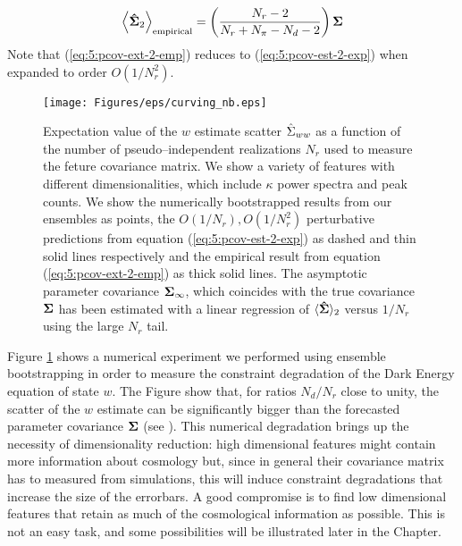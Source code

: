 \begin{equation}
\label{eq:5:pcov-ext-2-emp}
\left\langle\mathbf{\hat{\Sigma}}_2\right\rangle_{\rm empirical} = \left(\frac{N_r-2}{N_r+N_\pi-N_d-2}\right)\mathbf{\Sigma}
\end{equation}
%
Note that (\ref{eq:5:pcov-ext-2-emp}) reduces to (\ref{eq:5:pcov-est-2-exp}) when expanded to order $O(1/N_r^2)$. 
%
\begin{figure}
\begin{center}
\texttt{[image: Figures/eps/curving\_nb.eps]}
\end{center}
\caption{Expectation value of the $w$ estimate scatter $\hat{\Sigma}_{ww}$ as a function of the number of pseudo--independent realizations $N_r$ used to measure the feture covariance matrix. We show a variety of features with different dimensionalities, which include $\kappa$ power spectra and peak counts. We show the numerically bootstrapped results from our ensembles as points, the $O(1/N_r),O(1/N_r^2)$ perturbative predictions from equation (\ref{eq:5:pcov-est-2-exp}) as dashed and thin solid lines respectively and the empirical result from equation (\ref{eq:5:pcov-ext-2-emp}) as thick solid lines. The asymptotic parameter covariance $\mathbf{\Sigma}_\infty$, which coincides with the true covariance $\mathbf{\Sigma}$ has been estimated with a linear regression of $\langle\mathbf{\hat{\Sigma}}\rangle_2$ versus $1/N_r$ using the large $N_r$ tail.} 
\label{fig:5:curvenb}
\end{figure}
%
Figure \ref{fig:5:curvenb} shows a numerical experiment we performed using ensemble bootstrapping in order to measure the constraint degradation of the Dark Energy equation of state $w$. The Figure show that, for ratios $N_d/N_r$ close to unity, the scatter of the $w$ estimate can be significantly bigger than the forecasted parameter covariance $\mathbf{\Sigma}$ (see \citep{DodelsonSchneider13,PetriVariance}). This numerical degradation brings up the necessity of dimensionality reduction: high dimensional features might contain more information about cosmology but, since in general their covariance matrix has to measured from simulations, this will induce constraint degradations that increase the size of the errorbars. A good compromise is to find low dimensional features that retain as much of the cosmological information as possible. This is not an easy task, and some possibilities will be illustrated later in the Chapter.  

